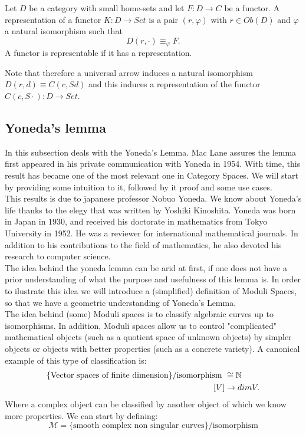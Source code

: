 \begin{definition}
  Let $D$ be a category with small home-sets and let $F:D\to C$ be a functor. A representation of a functor $K:D\to Set$ is a pair $(r,\varphi)$ with $r \in Ob(D)$ and $ \varphi$ a natural isomorphism  such that
  $$D(r,\cdot) \equiv_{\varphi} F.$$
  A functor is representable if it has a representation.
\end{definition}

Note that therefore a universal arrow induces a natural isomorphism $D(r,d)\equiv C(c,Sd)$ and this induces a representation of the functor $C(c,S\cdot): D\to Set$. 

\subsection{Yoneda's lemma}
In this subsection  deals with the Yoneda's Lemma. Mac Lane\cite{mac2013categories} assures the lemma first appeared in his private communication with Yoneda in 1954. With time, this result has became one of the most relevant one in Category Spaces. We will start by providing some intuition to it, followed by it proof and some use cases.\\


 This results is due to japanese professor Nobuo Yoneda. We know about Yoneda's life thanks to the elegy that was written by Yoshiki Kinoshita\cite{yonedaLife}. Yoneda was born in Japan in 1930, and received his doctorate in mathematics from Tokyo University in 1952. He was a reviewer for international mathematical journals. In addition to his contributions to the field of mathematics, he also devoted his research to computer science.\\


The idea behind the yoneda lemma can be arid at first, if one does not have a prior understanding of what the purpose and usefulness of this lemma is. In order to ilustrate this idea we will introduce a (simplified) definition of Moduli Spaces, so that we have a geometric understanding of Yoneda's Lemma.\\

The idea behind (some) Moduli spaces is to classify algebraic curves up to isomorphisms. In addition, Moduli spaces allow us to control "complicated" mathematical objects (such as a quotient space of unknown objects) by simpler objects or objects with better properties (such as a concrete variety). A canonical example of this type of classification is:  
\begin{align*}
  \{\text{Vector spaces of finite dimension}\}/\text{isomorphism } &\cong \mathbb{N}\\
  [V] &\to dim V.
\end{align*}
Where a complex object can be classified by another object of which we know more properties. We can start by defining:  
$$\mathcal{M} = \{\text{smooth complex non singular curves} \}/\text{isomorphism}$$

